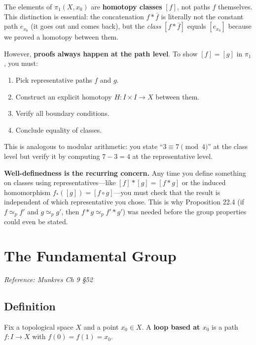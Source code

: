 \documentclass[11pt]{report}
\begin{document}
\begin{rembox}
The elements of $\pi_1(X, x_0)$ are \textbf{homotopy classes} $[f]$, not paths $f$ themselves. This distinction is essential: the concatenation $f * \bar{f}$ is literally not the constant path $e_{x_0}$ (it goes out and comes back), but the \emph{class} $[f * \bar{f}]$ equals $[e_{x_0}]$ because we proved a homotopy between them.

However, \textbf{proofs always happen at the path level}. To show $[f] = [g]$ in $\pi_1$, you must:
\begin{enumerate}[nosep]
    \item Pick representative paths $f$ and $g$.
    \item Construct an explicit homotopy $H: I \times I \to X$ between them.
    \item Verify all boundary conditions.
    \item Conclude equality of classes.
\end{enumerate}
This is analogous to modular arithmetic: you state ``$3 \equiv 7 \pmod{4}$'' at the class level but verify it by computing $7 - 3 = 4$ at the representative level.

\textbf{Well-definedness is the recurring concern.} Any time you define something on classes using representatives---like $[f] * [g] = [f * g]$ or the induced homomorphism $f_*([g]) = [f \circ g]$---you must check that the result is independent of which representative you chose. This is why Proposition 22.4 (if $f \simeq_p f'$ and $g \simeq_p g'$, then $f * g \simeq_p f' * g'$) was needed before the group properties could even be stated.
\end{rembox}

\section{The Fundamental Group}

\textit{Reference: Munkres Ch 9 \S 52}

\subsection{Definition}

\begin{defbox}[Loop]
Fix a topological space $X$ and a point $x_0 \in X$. A \textbf{loop based at $x_0$} is a path $f: I \to X$ with $f(0) = f(1) = x_0$.
\end{defbox}
\end{document}
